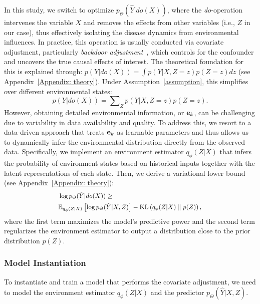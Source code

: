 In this study, we switch to optimize $p_\Theta(\hat{Y} | do(X))$, where the \textit{do}-operation intervenes the variable $X$ and removes the effects from other variables (i.e., $Z$ in our case), thus effectively isolating the disease dynamics from environmental influences. In practice, this operation is usually conducted via covariate adjustment, particularly \textit{backdoor adjustment}~\cite{suncaudits}, which controls for the confounder and uncovers the true causal effects of interest. The theoretical foundation for this is explained through: $p(Y | do(X)) = \int p(Y | X, Z=z) p(Z=z) dz$ (see Appendix~\ref{Appendix: theory}). Under Assumption~\ref{assumption}, this simplifies over different environmental states:
\begin{equation}
\label{Eq: do}
p(Y | do(X)) = \sum\nolimits_{Z} p(Y | X, Z=z) p(Z=z).  
\end{equation}
However, obtaining detailed environmental information, or ${\bf e}_k$, can be challenging due to variability in data availability and quality. To address this,  we resort to a data-driven approach that treats ${\bf e}_k$ as learnable parameters and thus allows us to dynamically infer the environmental distribution directly from the observed data. Specifically, we implement an environment estimator $q_\phi(Z|X)$ that infers the probability of environment states based on historical inputs together with the latent representations of each state. Then, we derive a variational lower bound (see Appendix~\ref{Appendix: theory}):
\begin{equation}
\label{Eq: lb}
\small
\begin{aligned}
&\log{p_\Theta(\hat{Y} | do(X))} \geq \\
& \mathbb{E}_{q_\phi(Z | X)} \left[ \log p_\Theta(\hat{Y} | X, Z) \right] - \operatorname{KL}\left(q_\phi(Z | X) \parallel p(Z)\right),
\end{aligned}
\end{equation}
where the first term maximizes the model's predictive power and the second term regularizes the environment estimator to output a distribution close to the prior distribution $p(Z)$.


\subsubsection{Model Instantiation}
To instantiate and train a model that performs the covariate adjustment, we need to model the environment estimator $q_\phi(Z | X)$ and the predictor $p_\Theta(\hat{Y} | X, Z)$.

